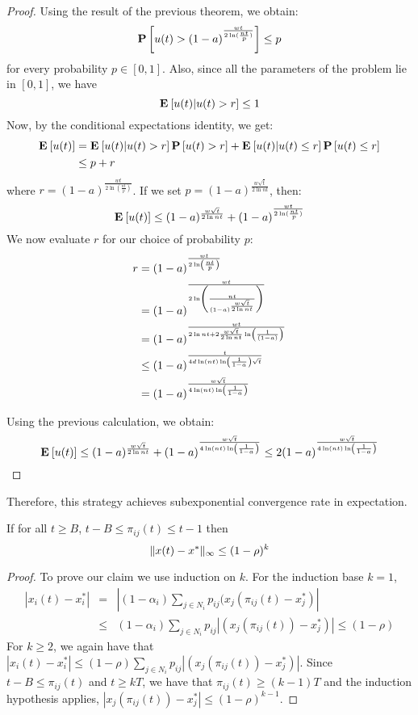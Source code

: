 \begin{proof}
Using the result of the previous theorem, we obtain:
$$ \bm{\mathrm{P}}\left[u(t) > (1-a)^{\frac{wt}{2\ln( \frac{nt}{p})} }\right] \leq p $$
for every probability $p \in [0,1]$. Also, since all the parameters of the problem lie in $[0,1]$, we have
$$\Exp{u(t)|u(t) > r} \leq 1$$
Now, by the conditional expectations identity, we get:
\begin{align*}
\Exp{u(t)} &= \Exp{u(t)|u(t) > r}\Prob{u(t) > r} +\Exp{u(t)|u(t) \leq r}\Prob{u(t) \leq r}\\
&\leq p + r
\end{align*}
where $r = (1-a)^{\frac{wt}{2\ln( \frac{nt}{p})} }$. If we set $p = (1-a)^{\frac{w\sqrt{t}}{2\ln nt}}$, then:
$$
\Exp{u(t)} \leq (1-a)^{\frac{w\sqrt{t}}{2\ln nt}} + (1-a)^{\frac{wt}{2\ln( \frac{nt}{p})} }
$$
We now evaluate $r$ for our choice of probability $p$:
\begin{align*}
r
&= (1-a)^{\frac{wt}{2\ln\left( \frac{nt}{p}\right)} }\\
&= (1-a)^{\frac{wt}{2\ln\left( \frac{nt}{(1-a)^{\frac{w\sqrt{t}}{2\ln nt}}}\right)} }\\
&= (1-a)^{\frac{wt}{2\ln nt + 2\frac{w\sqrt{t}}{2\ln nt}\ln\left( \frac{1}{(1-a)}\right) }}\\
&\leq (1-a)^{\frac{t}{4d\ln(nt)\ln\left( \frac{1}{1-a}\right) \sqrt{t}}}\\
&= (1-a)^{\frac{w\sqrt{t}}{4\ln(nt)\ln\left( \frac{1}{1-a}\right)}}
\end{align*}

Using the previous calculation, we obtain:
$$ \Exp{u(t)} \leq (1-a)^{\frac{w\sqrt{t}}{2\ln nt}} + (1-a)^{\frac{w\sqrt{t}}{4\ln(nt)\ln\lp( \frac{1}{1-a}\rp)}} \leq 2(1-a)^{\frac{w\sqrt{t}}{4\ln(nt)\ln\lp( \frac{1}{1-a}\rp)}}$$
\end{proof}
Therefore, this strategy achieves subexponential convergence rate in expectation.

\begin{lemma}\label{l:simple_induction}
If for all $t\geq B$, $t-B \leq \pi_{ij}(t) \leq t-1$ then
\[\| x(t) - x^* \|_{\infty} \leq (1-\rho)^k\]
\end{lemma}

\begin{proof}
To prove our claim we use induction on $k$. For the induction base $k=1$,
\begin{eqnarray*}
|x_i(t) - x_i^*| &=& |(1-\alpha_i)\sum_{j \in N_i}p_{ij}(x_j(\pi_{ij}(t)-x_j^*)|\\
&\leq& (1-\alpha_i)\sum_{j \in N_i}p_{ij}|(x_j(\pi_{ij}(t))-x_j^*)|\leq (1-\rho)
\end{eqnarray*}
For $k\geq 2$, we again have that $|x_i(t) - x_i^*|\leq (1-\rho)\sum_{j \in N_i}p_{ij}|(x_j(\pi_{ij}(t))-x_j^*)|$.
Since $t-B \leq \pi_{ij}(t)$ and $t\geq kT$, we have that $\pi_{ij}(t) \geq (k-1)T$ and the induction hypothesis applies,
$|x_j(\pi_{ij}(t))-x_j^*| \leq (1-\rho)^{k-1}$.
\end{proof}
